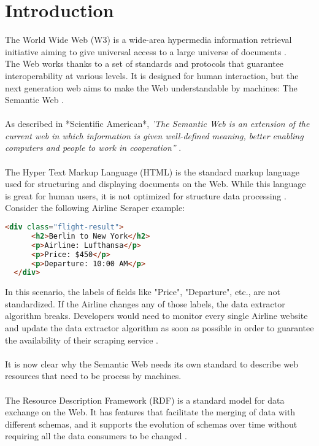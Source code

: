 \chapter{Introduction\label{cha:chapter1}}

The World Wide Web (W3) is a wide-area hypermedia information retrieval initiative aiming to give universal access to a large universe of documents \cite{www}.
\\
The Web works thanks to a set of standards and protocols that guarantee interoperability at various levels. 
It is designed for human interaction, but the next generation web aims to make the Web understandable by machines: The Semantic Web \cite{sematicWeb}.
\\
\\
As described in *Scientific American*, 
\textit{'The Semantic Web is an extension of the current web in which information is given well-defined meaning, better enabling computers and people to work in cooperation''} \cite{bernerslee2001semantic}.
\\
\\
The Hyper Text Markup Language (HTML) is the standard markup language used for structuring and displaying documents on the Web.
While this language is great for human users, it is not optimized for structure data processing \cite{herman2003semanticweb}. 
\\
Consider the following Airline Scraper example:
\begin{lstlisting}[language=HTML, caption={Example of HTML flight data from an Airline company}, label={lst:html-example}]
  <div class="flight-result">
      <h2>Berlin to New York</h2>
      <p>Airline: Lufthansa</p>
      <p>Price: $450</p>
      <p>Departure: 10:00 AM</p>
  </div>
  \end{lstlisting}
In this scenario, the labels of fields like "Price", "Departure", etc., are not standardized. If the Airline changes any of those labels, the data extractor algorithm breaks. 
Developers would need to monitor every single Airline website and update the data extractor algorithm as soon as possible in order to guarantee the availability of their scraping service \cite{herman2003semanticweb}.
\\
\\
It is now clear why the Semantic Web needs its own standard to describe web resources that need to be process by machines.
\\
\\
The Resource Description Framework (RDF) is a standard model for data exchange on the Web. It has features that facilitate the merging of data with different schemas, and it supports the evolution of schemas over time without requiring all the data consumers to be changed \cite{rdf}.
